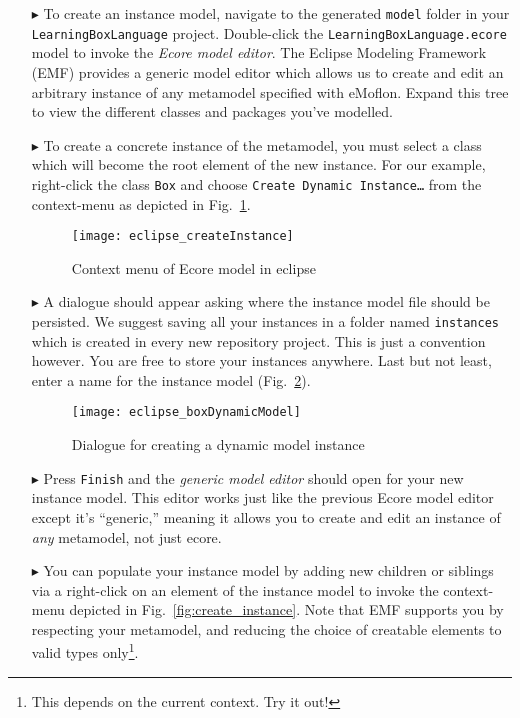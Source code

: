 \begin{itemize}

\item[$\blacktriangleright$] To create an instance model, navigate to the generated \texttt{model} folder in your \texttt{LearningBoxLanguage} project.
Double-click the \texttt{LearningBoxLanguage.ecore} model to invoke  the \emph{Ecore model editor}. The Eclipse Modeling Framework (EMF) provides a generic
model editor which allows us to create and edit an arbitrary instance of any metamodel specified with eMoflon. Expand this tree to view the different classes
and packages you've modelled.

\item[$\blacktriangleright$] To create a concrete instance of the metamodel, you must select a class which will become the root element of the new instance.
For our example, right-click the class \texttt{Box} and choose \texttt{Create Dynamic Instance\ldots} from the context-menu as depicted in
Fig.~\ref{fig:context_menu}.

\begin{figure}[htbp]
	\centering
  \texttt{[image: eclipse\_createInstance]}
	\caption{Context menu of Ecore model in eclipse}
	\label{fig:context_menu}
\end{figure}


\item[$\blacktriangleright$] A dialogue should appear asking where the instance model file should be persisted. We suggest saving all your instances in a folder
named \texttt{instances} which is created in every new repository project. This is just a convention however. You are free to store your instances anywhere.
Last but not least, enter a name for the instance model (Fig.~\ref{fig:store_dynamic_instance}).

\begin{figure}[htbp]
	\centering
  \texttt{[image: eclipse\_boxDynamicModel]}
	\caption{Dialogue for creating a dynamic model instance}
	\label{fig:store_dynamic_instance}
\end{figure}

\item[$\blacktriangleright$] Press \texttt{Finish} and the \emph{generic model editor} should open for your new instance model. This editor works just like the
previous Ecore model editor except it's ``generic,'' meaning it allows you to create and edit an instance of \emph{any} metamodel, not just ecore.

\item[$\blacktriangleright$] You can populate your instance model by adding new children or siblings via a right-click on an element of the instance model to
invoke the context-menu depicted in Fig.~\ref{fig:create_instance}. Note that EMF supports you by respecting your metamodel, and reducing the choice of
creatable elements to valid types only\footnote{This depends on the current context. Try it out!}.


\end{itemize}

